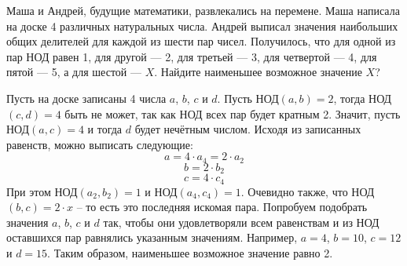 
Маша и Андрей, будущие математики, развлекались на перемене. 
Маша написала на доске 4  различных натуральных числа. 
Андрей выписал значения наибольших общих делителей для каждой из шести пар чисел. 
Получилось, что для одной из пар НОД  равен 1, для другой — 2, для третьей — 3, для четвертой — 4, 
для пятой — 5, а для шестой — $X$. Найдите наименьшее возможное значение $X$?

\soultionSection

Пусть на доске записаны 4 числа $a$, $b$, $c$ и $d$. Пусть НОД$(a, b) = 2$, тогда НОД$(c, d) = 4$ быть не может, так как НОД всех пар будет кратным 2. Значит, пусть НОД$(a, c) = 4$ и тогда $d$ будет нечётным числом.
Исходя из записанных равенств, можно выписать следующие:
$$a = 4\cdot a_4 = 2 \cdot a_2$$
$$b = 2\cdot b_2$$
$$c = 4\cdot c_4$$
При этом НОД$(a_2, b_2) = 1$ и НОД$(a_4, c_4) = 1$. Очевидно также, что НОД$(b, c) = 2 \cdot x$ -- то есть это последняя искомая пара. Попробуем подобрать значения $a$, $b$, $c$ и $d$ так, чтобы они удовлетворяли всем равенствам и из НОД оставшихся пар равнялись указанным значениям. Например, $a = 4$, $b = 10$, $c = 12$ и $d = 15$. Таким образом, наименьшее возможное значение равно 2.

